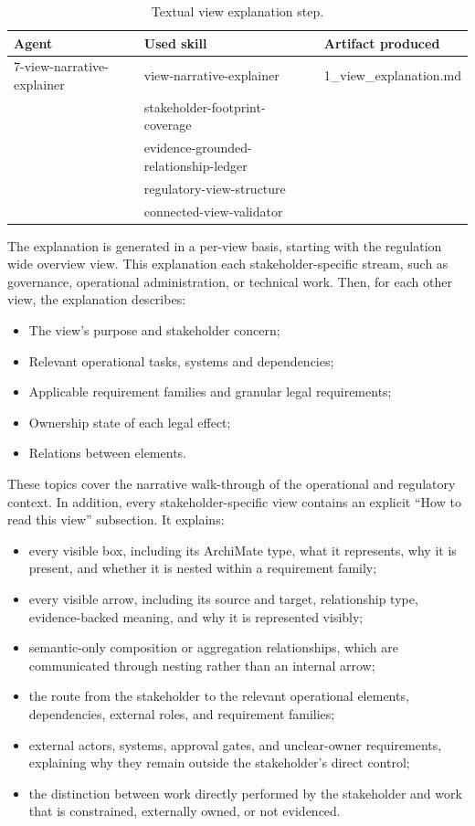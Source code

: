 \begin{table}[h]
\centering
\small
\begin{tabular}{p{5.2cm} p{5.5cm} p{3.5cm}}
\hline
\textbf{Agent} & \textbf{Used skill} & \textbf{Artifact produced} \\
\hline
7-view-narrative-explainer &
view-narrative-explainer &
1\_view\_explanation.md \\
 &
stakeholder-footprint-coverage &
\\
 &
evidence-grounded-relationship-ledger &
\\
 &
regulatory-view-structure &
\\
 &
connected-view-validator &
\\
\hline
\end{tabular}
\caption{Textual view explanation step.}
\label{tab:textual-view-explanation}
\end{table}
The explanation is generated in a per-view basis, starting with the regulation wide overview view. This explanation each stakeholder-specific stream, such as governance, operational administration, or technical work. Then, for each other view, the explanation describes:
\begin{itemize}
    \item The view's purpose and stakeholder concern;
    \item Relevant operational tasks, systems and dependencies;
    \item Applicable requirement families and granular legal requirements;
    \item Ownership state of each legal effect;
    \item Relations between elements.
\end{itemize}
These topics cover the narrative walk-through of the operational and regulatory context. In addition, every stakeholder-specific view contains an explicit ``How to read this view'' subsection. It explains:
\begin{itemize}
    \item every visible box, including its ArchiMate type, what it represents, why it is present, and whether it is nested within a requirement family;
    \item every visible arrow, including its source and target, relationship type, evidence-backed meaning, and why it is represented visibly;
    \item semantic-only composition or aggregation relationships, which are communicated through nesting rather than an internal arrow;
    \item the route from the stakeholder to the relevant operational elements, dependencies, external roles, and requirement families;
    \item external actors, systems, approval gates, and unclear-owner requirements, explaining why they remain outside the stakeholder's direct control;
    \item the distinction between work directly performed by the stakeholder and work that is constrained, externally owned, or not evidenced.
\end{itemize}
